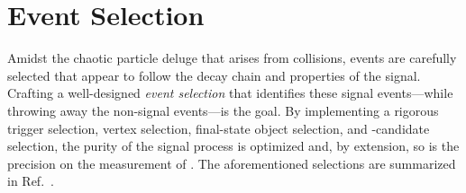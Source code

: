 \section{Event Selection}
\label{sec:evt_sel}
Amidst the chaotic particle deluge that arises from \pp collisions, events are carefully selected that appear to follow the decay chain and properties of the \hzzfourl signal.
Crafting a well-designed \emph{event selection} that identifies these signal events---while throwing away the non-signal events---is the goal.
By implementing a rigorous trigger selection,
vertex selection,
final-state object selection,
and \ZZ-candidate selection,
the purity of the signal process is optimized and, by extension, so is the precision on the measurement of \mH.
The aforementioned selections are summarized in Ref.~\cite{TODO:AN-19-139v6---HIG-19-001}.



